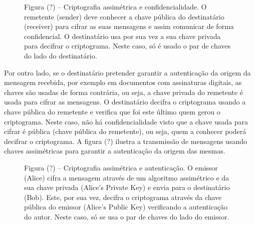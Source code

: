 \documentclass[a4paper,11pt,openright,oneside]{report}
\begin{document}
\begin{figure}[ht]
\center
{}
\caption{Figura (?) – Criptografia assimétrica e confidencialidade. O remetente (sender) deve conhecer a chave pública do destinatário (receiver) para cifrar as suas mensagens e assim comunicar de forma confidencial. O destinatário usa por sua vez a sua chave privada para decifrar o criptograma. Neste caso, só é usado o par de chaves do lado do destinatário.}
\label{fig:crypto3}
\end{figure}

Por outro lado, se o destinatário pretender garantir a autenticação da origem da mensagem recebida, por exemplo em documentos com assinaturas digitais, as chaves são usadas de forma contrária, ou seja, a chave privada do remetente é usada para cifrar as mensagens. O destinatário decifra o criptograma usando a chave pública do remetente e verifica que foi este último quem gerou o criptograma. Neste caso, não há confidencialidade visto que a chave usada para cifrar é pública (chave pública do remetente), ou seja, quem a conhecer poderá decifrar o criptograma. A figura (?) ilustra a transmissão de mensagens usando chaves assimétricas para garantir a autenticação da origem das mesmas.\\

\begin{figure}[ht]
\center
{}
\caption{Figura (?) – Criptografia assimétrica e autenticação. O emissor (Alice) cifra a mensagem através de um algoritmo assimétrico e da sua chave privada (Alice’s Private Key) e envia para o destinatário (Bob). Este, por sua vez, decifra o criptograma através da chave pública do emissor (Alice’s Public Key) verificando a autenticação do autor. Neste caso, só se usa o par de chaves do lado do emissor. }
\label{fig:crypto4}
\end{figure}
\end{document}
